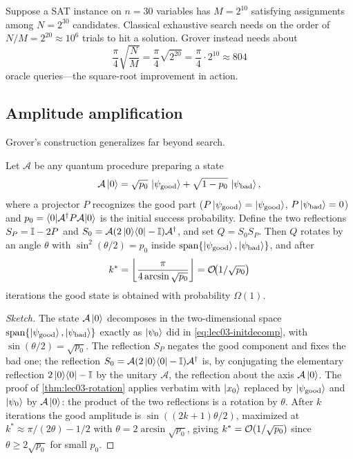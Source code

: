 \begin{example}
\label{exa:lec03-satcount}
Suppose a SAT instance on $n=30$ variables has $M=2^{10}$ satisfying assignments
among $N=2^{30}$ candidates. Classical exhaustive search needs on the order of
$N/M=2^{20}\approx10^{6}$ trials to hit a solution. Grover instead needs about
\[
  \frac{\pi}{4}\sqrt{\frac{N}{M}}
    =\frac{\pi}{4}\sqrt{2^{20}}
    =\frac{\pi}{4}\cdot2^{10}\approx804
\]
oracle queries---the square-root improvement in action.
\end{example}

\subsection{Amplitude amplification}

Grover's construction generalizes far beyond search.

\begin{theorem}
\label{thm:lec03-aa}
Let $\mathcal A$ be any quantum procedure preparing a state
\[
  \mathcal A\ket{0}=\sqrt{p_0}\,\ket{\psi_{\mathrm{good}}}+\sqrt{1-p_0}\,\ket{\psi_{\mathrm{bad}}},
\]
where a projector $P$ recognizes the good part
($P\ket{\psi_{\mathrm{good}}}=\ket{\psi_{\mathrm{good}}}$,
$P\ket{\psi_{\mathrm{bad}}}=0$) and $p_0=\braket{0|\mathcal A^{\dagger} P\mathcal A|0}$ is
the initial success probability. Define the two reflections
$S_P=\mathbb{I}-2P$ and $S_0=\mathcal A(2\ket{0}\!\bra{0}-\mathbb{I})\mathcal A^{\dagger}$, and set
$Q=S_0S_P$. Then $Q$ rotates by an angle $\theta$ with
$\sin^{2}(\theta/2)=p_0$ inside
$\operatorname{span}\{\ket{\psi_{\mathrm{good}}},\ket{\psi_{\mathrm{bad}}}\}$, and
after
\[
  k^{\ast}=\left\lfloor\frac{\pi}{4\arcsin\sqrt{p_0}}\right\rfloor
  =\mathcal{O}\!\bigl(1/\sqrt{p_0}\bigr)
\]
iterations the good state is obtained with probability $\Omega(1)$.
\end{theorem}

\begin{proof}[Sketch]
The state $\mathcal A\ket{0}$ decomposes in the two-dimensional space
$\operatorname{span}\{\ket{\psi_{\mathrm{good}}},\ket{\psi_{\mathrm{bad}}}\}$
exactly as $\ket{\psi_0}$ did in \eqref{eq:lec03-initdecomp}, with
$\sin(\theta/2)=\sqrt{p_0}$. The reflection $S_P$ negates the good component and
fixes the bad one; the reflection $S_0=\mathcal A(2\ket{0}\!\bra{0}-\mathbb{I})\mathcal A^{\dagger}$ is,
by conjugating the elementary reflection $2\ket{0}\!\bra{0}-\mathbb{I}$ by the unitary $\mathcal A$,
the reflection about the axis $\mathcal A\ket{0}$. The proof of
\cref{thm:lec03-rotation} applies verbatim with $\ket{x_0}$ replaced by
$\ket{\psi_{\mathrm{good}}}$ and $\ket{\psi_0}$ by $\mathcal A\ket{0}$: the product
of the two reflections is a rotation by $\theta$. After $k$ iterations the good
amplitude is $\sin((2k+1)\theta/2)$, maximized at
$k^{\ast}\approx\pi/(2\theta)-1/2$ with $\theta=2\arcsin\sqrt{p_0}$, giving
$k^{\ast}=\mathcal{O}(1/\sqrt{p_0})$ since $\theta\ge2\sqrt{p_0}$ for small $p_0$.
\end{proof}

